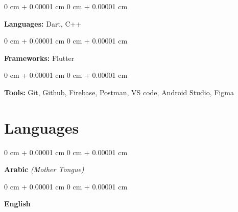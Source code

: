 \documentclass[10pt, letterpaper]{article}
\newenvironment{onecolentry}{
    \begin{adjustwidth}{
        0 cm + 0.00001 cm
    }{
        0 cm + 0.00001 cm
    }
}{
    \end{adjustwidth}
} %
\begin{document}
        
        \begin{onecolentry}
            \textbf{Languages:} Dart, C++
        \end{onecolentry}

        \vspace{0.2 cm}

        \begin{onecolentry}
            \textbf{Frameworks:} Flutter
        \end{onecolentry}

        \vspace{0.2 cm}

        \begin{onecolentry}
            \textbf{Tools:} Git, Github, Firebase, Postman, VS code, Android Studio, Figma
        \end{onecolentry}

        

 

    \section{Languages}
        \begin{onecolentry}
            \textbf{Arabic}
            \hspace{0.2 cm}
            \textit{(Mother Tongue)}
        \end{onecolentry}

        \vspace{0.2 cm}

        \begin{onecolentry}
            \textbf{English}
        \end{onecolentry}


    
\end{document}
